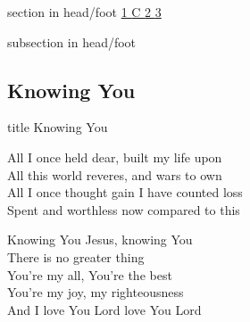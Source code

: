 \documentclass[aspectratio=169]{beamer}
\begin{document}
{
{ 
 {
 \begin{beamercolorbox}[ht=4.5ex,dp=1.5ex,%
      leftskip=.3cm,rightskip=.3cm plus1fil]{section in head/foot}
 \fontsize{12}{25}\selectfont 
\hyperlink{Knowing You['All I once held dear']1}{1  }\hyperlink{Knowing You['All I once held dear']C}{C  }\hyperlink{Knowing You['All I once held dear']2}{2  }\hyperlink{Knowing You['All I once held dear']3}{3  } 
 \end{beamercolorbox}%
  \begin{beamercolorbox}[ht=2.5ex,dp=1.125ex,%
   leftskip=.3cm,rightskip=.3cm plus1fil]{subsection in head/foot}
   \insertauthor
 \end{beamercolorbox}%
 }
}
\subsection{Knowing You}
\hypertarget{Knowing You['All I once held dear']}{}
\begin{frame}{}
 \vfill
  \centering
  \begin{beamercolorbox}[sep=8pt,center,shadow=true,rounded=true]{title}
    Knowing You     
  \end{beamercolorbox}
  \vfill
\end{frame}

\hypertarget{Knowing You['All I once held dear']1}{}
\begin{frame}{}
\fontsize{20.930232558139537}{25.116279069767444}\selectfont

All I once held dear, built my life upon\\ 
All this world reveres, and wars to own\\ 
All I once thought gain I have counted loss\\ 
Spent and worthless now compared to this

\end{frame}
\hypertarget{Knowing You['All I once held dear']C}{}
\begin{frame}{}
\fontsize{20.930232558139537}{25.116279069767444}\selectfont

Knowing You Jesus, knowing You\\ 
There is no greater thing\\ 
You're my all, You're the best\\ 
You're my joy, my righteousness\\ 
And I love You Lord love You Lord


\end{frame}}
\end{document}
